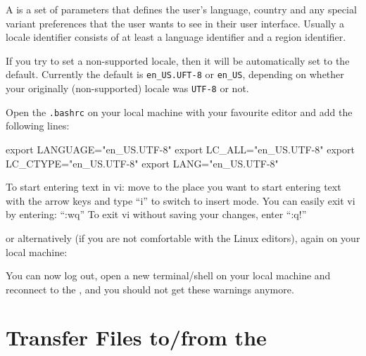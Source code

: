 A  is a set of parameters that defines the user's language,
country and any special variant preferences that the user wants to see in their
user interface. Usually a locale identifier consists of at least a language
identifier and a region identifier.

\ifgent
{} If you try to set a non-supported locale, then it will be
automatically set to the default. Currently the default is
\lstinline|en_US.UFT-8| or \lstinline|en_US|, depending on whether your
originally (non-supported) locale was \lstinline|UTF-8| or not.
\fi

\ifmacORlinux
Open the  \lstinline|.bashrc| on your local machine with your
favourite editor and add the following lines:

\begin{prompt}
export LANGUAGE="en_US.UTF-8"
export LC_ALL="en_US.UTF-8"
export LC_CTYPE="en_US.UTF-8"
export LANG="en_US.UTF-8"
\end{prompt}

\begin{tip}[vi]
To start entering text in vi: move to the place you want to start entering text
with the arrow keys and type ``i'' to switch to insert mode.  You can easily
exit vi by entering: ``:wq''
To exit vi without saving your changes, enter ``:q!''
\end{tip}

or alternatively (if you are not comfortable with the Linux editors), again on your local machine:

\begin{prompt}
\end{prompt}

You can now log out, open a new terminal/shell on your local machine and reconnect to the \hpc, and you should not get these
warnings anymore.

\fi
\section{Transfer Files to/from the \hpc}
\label{sec:filetransfer}
\hypertarget{sec:filetransfer}{}


